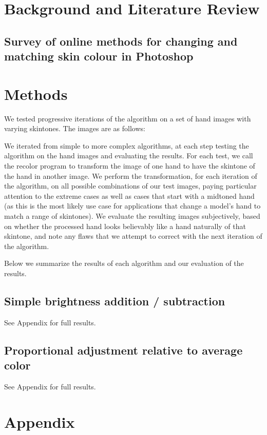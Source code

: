 \documentclass[12pt, a4paper]{article}
\begin{document}
\listoftables

\section{Background and Literature Review}
\subsection{Survey of online methods for changing and matching skin colour in Photoshop}

\section{Methods}
We tested progressive iterations of the algorithm on a set of hand images with varying skintones. The images are as follows:

We iterated from simple to more complex algorithms, at each step testing the algorithm on the hand images and evaluating the results. For each test, we call the recolor program to transform the image of one hand to have the skintone of the hand in another image. We perform the transformation, for each iteration of the algorithm, on all possible combinations of our test images, paying particular attention to the extreme cases as well as cases that start with a midtoned hand (as this is the most likely use case for applications that change a model's hand to match a range of skintones). We evaluate the resulting images subjectively, based on whether the processed hand looks believably like a hand naturally of that skintone, and note any flaws that we attempt to correct with the next iteration of the algorithm.

Below we summarize the results of each algorithm and our evaluation of the results.

\subsection{Simple brightness addition / subtraction}
See Appendix for full results.

\subsection{Proportional adjustment relative to average color}
See Appendix for full results.

\pagebreak

\section*{Appendix}

\end{document}
